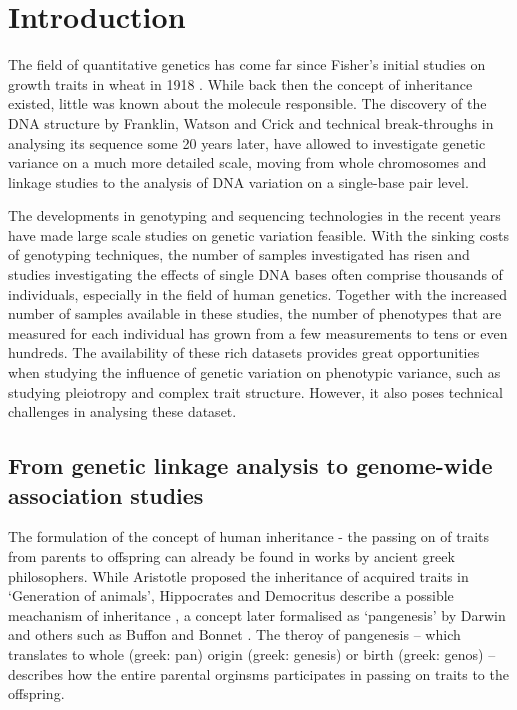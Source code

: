 \chapter{Introduction}

The field of quantitative genetics has come far since Fisher's initial studies on growth traits in wheat in 1918 \citep{}. While back then the concept of inheritance existed, little was known about the molecule responsible.  The discovery of the DNA structure by Franklin, Watson and Crick and technical break-throughs in analysing its sequence some 20 years later, have allowed to investigate genetic variance on a much more detailed scale, moving from whole chromosomes and linkage studies to the analysis of DNA variation on a single-base pair level. 

The developments in genotyping and sequencing technologies in the recent years have made large scale studies on genetic variation feasible. With the sinking costs of genotyping techniques, the number of samples investigated has risen and studies investigating the effects of single DNA bases often comprise thousands of individuals, especially in the field of human genetics.  Together with the increased number of samples available in these studies, the number of phenotypes that are measured for each individual has grown from a few measurements to tens or even hundreds. The availability of these rich datasets provides great opportunities when studying the influence of genetic variation on phenotypic variance, such as studying pleiotropy and complex trait structure. However, it also poses technical challenges in analysing these dataset. 

\section{From genetic linkage analysis to genome-wide association studies}
The formulation of the concept of human inheritance - the passing on of traits from parents to offspring can already be found in works by ancient greek philosophers. While Aristotle proposed the inheritance of acquired traits in `Generation of animals', Hippocrates and Democritus describe a possible meachanism of inheritance \citep{Zirkle1935}, a concept later formalised as `pangenesis' by Darwin \citep{Darwin1868} and others such as Buffon \citep{Buffon1749} and Bonnet \citep{Bonnet1781}. The theroy of pangenesis -- which translates to whole (greek: pan) origin (greek: genesis) or birth (greek: genos) -- describes how the entire parental orginsms participates in passing on traits to the offspring. 

